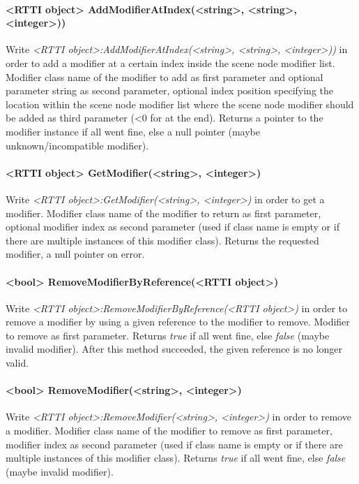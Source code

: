 \paragraph{<RTTI object> AddModifierAtIndex(<string>, <string>, <integer>))}
Write \emph{<RTTI object>:AddModifierAtIndex(<string>, <string>, <integer>))} in order to add a modifier at a certain index inside the scene node modifier list. Modifier class name of the modifier to add as first parameter and optional parameter string as second parameter, optional index position specifying the location within the scene node modifier list where the scene node modifier should be added as third parameter (<0 for at the end). Returns a pointer to the modifier instance if all went fine, else a null pointer (maybe unknown/incompatible modifier).

\paragraph{<RTTI object> GetModifier(<string>, <integer>)}
Write \emph{<RTTI object>:GetModifier(<string>, <integer>)} in order to get a modifier. Modifier class name of the modifier to return as first parameter, optional modifier index as second parameter (used if class name is empty or if there are multiple instances of this modifier class). Returns the requested modifier, a null pointer on error.

\paragraph{<bool> RemoveModifierByReference(<RTTI object>)}
Write \emph{<RTTI object>:RemoveModifierByReference(<RTTI object>)} in order to remove a modifier by using a given reference to the modifier to remove. Modifier to remove as first parameter. Returns \emph{true} if all went fine, else \emph{false} (maybe invalid modifier). After this method succeeded, the given reference is no longer valid.

\paragraph{<bool> RemoveModifier(<string>, <integer>)}
Write \emph{<RTTI object>:RemoveModifier(<string>, <integer>)} in order to remove a modifier. Modifier class name of the modifier to remove as first parameter, modifier index as second parameter (used if class name is empty or if there are multiple instances of this modifier class). Returns \emph{true} if all went fine, else \emph{false} (maybe invalid modifier).


